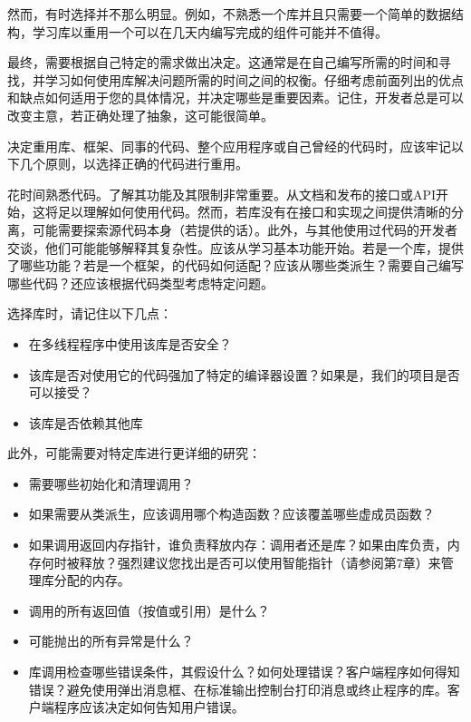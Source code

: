 然而，有时选择并不那么明显。例如，不熟悉一个库并且只需要一个简单的数据结构，学习库以重用一个可以在几天内编写完成的组件可能并不值得。

最终，需要根据自己特定的需求做出决定。这通常是在自己编写所需的时间和寻找，并学习如何使用库解决问题所需的时间之间的权衡。仔细考虑前面列出的优点和缺点如何适用于您的具体情况，并决定哪些是重要因素。记住，开发者总是可以改变主意，若正确处理了抽象，这可能很简单。


决定重用库、框架、同事的代码、整个应用程序或自己曾经的代码时，应该牢记以下几个原则，以选择正确的代码进行重用。


花时间熟悉代码。了解其功能及其限制非常重要。从文档和发布的接口或API开始，这将足以理解如何使用代码。然而，若库没有在接口和实现之间提供清晰的分离，可能需要探索源代码本身（若提供的话）。此外，与其他使用过代码的开发者交谈，他们可能能够解释其复杂性。应该从学习基本功能开始。若是一个库，提供了哪些功能？若是一个框架，的代码如何适配？应该从哪些类派生？需要自己编写哪些代码？还应该根据代码类型考虑特定问题。

选择库时，请记住以下几点：

\begin{itemize}
\item
在多线程程序中使用该库是否安全？

\item
该库是否对使用它的代码强加了特定的编译器设置？如果是，我们的项目是否可以接受？

\item
该库是否依赖其他库
\end{itemize}

此外，可能需要对特定库进行更详细的研究：

\begin{itemize}
\item
需要哪些初始化和清理调用？

\item
如果需要从类派生，应该调用哪个构造函数？应该覆盖哪些虚成员函数？

\item
如果调用返回内存指针，谁负责释放内存：调用者还是库？如果由库负责，内存何时被释放？强烈建议您找出是否可以使用智能指针（请参阅第7章）来管理库分配的内存。

\item
调用的所有返回值（按值或引用）是什么？

\item
可能抛出的所有异常是什么？

\item
库调用检查哪些错误条件，其假设什么？如何处理错误？客户端程序如何得知错误？避免使用弹出消息框、在标准输出控制台打印消息或终止程序的库。客户端程序应该决定如何告知用户错误。
\end{itemize}


